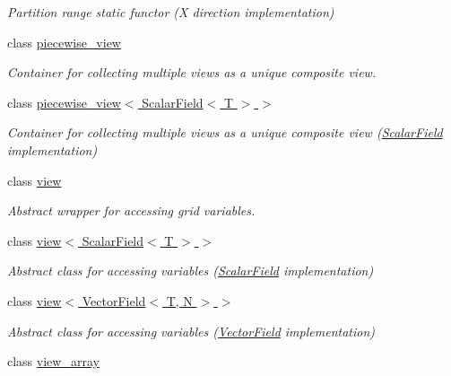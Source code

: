 \begin{DoxyCompactItemize}
\begin{DoxyCompactList}\small\item\em Partition range static functor (X direction implementation) \end{DoxyCompactList}\item 
class \hyperlink{classUintah_1_1PhaseField_1_1detail_1_1piecewise__view}{piecewise\+\_\+view}
\begin{DoxyCompactList}\small\item\em Container for collecting multiple views as a unique composite view. \end{DoxyCompactList}\item 
class \hyperlink{classUintah_1_1PhaseField_1_1detail_1_1piecewise__view_3_01ScalarField_3_01T_01_4_01_4}{piecewise\+\_\+view$<$ Scalar\+Field$<$ T $>$ $>$}
\begin{DoxyCompactList}\small\item\em Container for collecting multiple views as a unique composite view (\hyperlink{structUintah_1_1PhaseField_1_1ScalarField}{Scalar\+Field} implementation) \end{DoxyCompactList}\item 
class \hyperlink{classUintah_1_1PhaseField_1_1detail_1_1view}{view}
\begin{DoxyCompactList}\small\item\em Abstract wrapper for accessing grid variables. \end{DoxyCompactList}\item 
class \hyperlink{classUintah_1_1PhaseField_1_1detail_1_1view_3_01ScalarField_3_01T_01_4_01_4}{view$<$ Scalar\+Field$<$ T $>$ $>$}
\begin{DoxyCompactList}\small\item\em Abstract class for accessing variables (\hyperlink{structUintah_1_1PhaseField_1_1ScalarField}{Scalar\+Field} implementation) \end{DoxyCompactList}\item 
class \hyperlink{classUintah_1_1PhaseField_1_1detail_1_1view_3_01VectorField_3_01T_00_01N_01_4_01_4}{view$<$ Vector\+Field$<$ T, N $>$ $>$}
\begin{DoxyCompactList}\small\item\em Abstract class for accessing variables (\hyperlink{structUintah_1_1PhaseField_1_1VectorField}{Vector\+Field} implementation) \end{DoxyCompactList}\item 
class \hyperlink{classUintah_1_1PhaseField_1_1detail_1_1view__array}{view\+\_\+array}

\end{DoxyCompactItemize}
